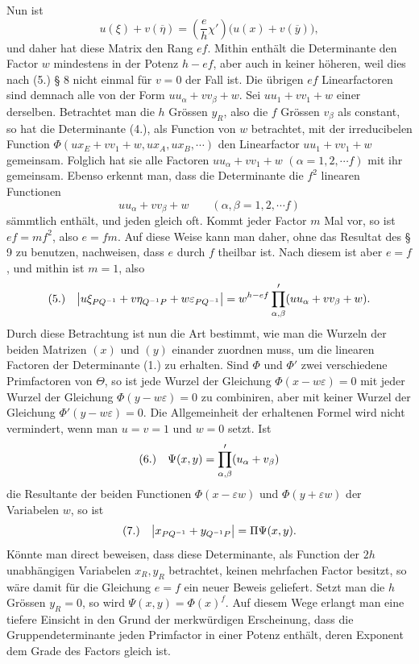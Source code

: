 \documentclass[11pt]{article}
\makeatletter
\newcommand{\frobtag}[2]{\[\begin{array}{@{}r@{\quad}l@{}}\textup{(#1)} & \displaystyle #2\end{array}\]}
\newcommand{\frobtagc}[2]{\[\begin{array}{@{}r@{\quad}c@{}}\textup{(#1)} & \displaystyle #2\end{array}\]}
\makeatother
\begin{document}
Nun ist
\[
u(\xi)+v(\overline{\eta})=\left(\frac{e}{h}\chi'\right)\bigl(u(x)+v(\overline{y})\bigr),
\]
und daher hat diese Matrix den Rang $ef$. Mithin enthält die Determinante den Factor $w$ mindestens in der Potenz $h-ef$, aber auch in keiner höheren, weil dies nach (5.) § 8 nicht einmal für $v=0$ der Fall ist. Die übrigen $ef$ Linearfactoren sind demnach alle von der Form $uu_\alpha+vv_\beta+w$. Sei $uu_1+vv_1+w$ einer derselben. Betrachtet man die $h$ Grössen $y_R$, also die $f$ Grössen $v_\beta$ als constant, so hat die Determinante (4.), als Function von $w$ betrachtet, mit der irreducibelen Function $\Phi(ux_E+vv_1+w,ux_A,ux_B,\cdots)$ den Linearfactor $uu_1+vv_1+w$ gemeinsam. Folglich hat sie alle Factoren $uu_\alpha+vv_1+w$ $(\alpha=1,2,\cdots f)$ mit ihr gemeinsam. Ebenso erkennt man, dass die Determinante die $f^2$ linearen Functionen
\[
uu_\alpha+vv_\beta+w\qquad (\alpha,\beta=1,2,\cdots f)
\]
sämmtlich enthält, und jeden gleich oft. Kommt jeder Factor $m$ Mal vor, so ist $ef=mf^2$, also $e=fm$. Auf diese Weise kann man daher, ohne das Resultat des § 9 zu benutzen, nachweisen, dass $e$ durch $f$ theilbar ist. Nach diesem ist aber $e=f$, und mithin ist $m=1$, also
\frobtag{5.}{\left|u\xi_{PQ^{-1}}+v\eta_{Q^{-1}P}+w\varepsilon_{PQ^{-1}}\right|=w^{h-ef}\prod_{\alpha,\beta}'(uu_\alpha+vv_\beta+w).}
Durch diese Betrachtung ist nun die Art bestimmt, wie man die Wurzeln der beiden Matrizen $(x)$ und $(y)$ einander zuordnen muss, um die linearen Factoren der Determinante (1.) zu erhalten. Sind $\Phi$ und $\Phi'$ zwei verschiedene Primfactoren von $\Theta$, so ist jede Wurzel der Gleichung $\Phi(x-w\varepsilon)=0$ mit jeder Wurzel der Gleichung $\Phi(y-w\varepsilon)=0$ zu combiniren, aber mit keiner Wurzel der Gleichung $\Phi'(y-w\varepsilon)=0$. Die Allgemeinheit der erhaltenen Formel wird nicht vermindert, wenn man $u=v=1$ und $w=0$ setzt. Ist
\frobtagc{6.}{\Psi(x,y)=\prod_{\alpha,\beta}'(u_\alpha+v_\beta)}
die Resultante der beiden Functionen $\Phi(x-\varepsilon w)$ und $\Phi(y+\varepsilon w)$ der Variabelen $w$, so ist
\frobtagc{7.}{\left|x_{PQ^{-1}}+y_{Q^{-1}P}\right|=\Pi\Psi(x,y).}
Könnte man direct beweisen, dass diese Determinante, als Function der $2h$ unabhängigen Variabelen $x_R,y_R$ betrachtet, keinen mehrfachen Factor besitzt, so wäre damit für die Gleichung $e=f$ ein neuer Beweis geliefert. Setzt man die $h$ Grössen $y_R=0$, so wird $\Psi(x,y)=\Phi(x)^f$. Auf diesem Wege erlangt man eine tiefere Einsicht in den Grund der merkwürdigen Erscheinung, dass die Gruppendeterminante jeden Primfactor in einer Potenz enthält, deren Exponent dem Grade des Factors gleich ist.
\end{document}
